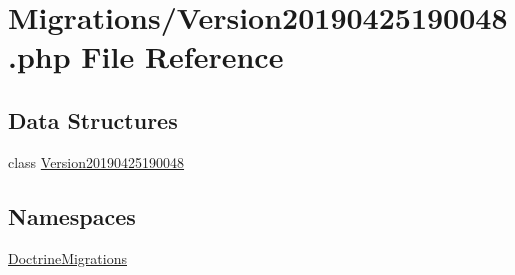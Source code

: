 \hypertarget{_version20190425190048_8php}{}\section{Migrations/\+Version20190425190048.php File Reference}
\label{_version20190425190048_8php}
\subsection*{Data Structures}
\begin{DoxyCompactItemize}
\item 
class \mbox{\hyperlink{class_doctrine_migrations_1_1_version20190425190048}{Version20190425190048}}
\end{DoxyCompactItemize}
\subsection*{Namespaces}
\begin{DoxyCompactItemize}
\item 
 \mbox{\hyperlink{namespace_doctrine_migrations}{Doctrine\+Migrations}}
\end{DoxyCompactItemize}

